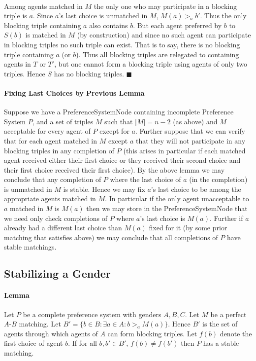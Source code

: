 \documentclass[letterpaper,12pt,oneside,onecolumn]{article}
\begin{document}
\paragraph{}
Among agents matched in $M$ the only one who may participate in a blocking triple is $a$. Since $a$'s last choice is unmatched in $M$, $M(a) >_a b'$. Thus the only blocking triple containing $a$ also contains $b$. But each agent preferred by $b$ to $S(b)$ is matched in $M$ (by construction) and since no such agent can participate in blocking triples no such triple can exist. That is to say, there is no blocking triple containing $a$ (or $b$). Thus all blocking triples are relegated to containing agents in $T$ or $T'$, but one cannot form a blocking triple using agents of only two triples. Hence $S$ has no blocking triples. $\blacksquare$
\paragraph{Fixing Last Choices by Previous Lemma}
Suppose we have a PreferenceSystemNode containing incomplete Preference System $P$, and a set of triples $M$ such that $|M| = n-2$ (as above) and $M$ acceptable for every agent of $P$ except for $a$. Further suppose that we can verify that for each agent matched in $M$ except $a$ that they will not participate in any blocking triples in any completion of $P$ (this arises in particular if each matched agent received either their first choice or they received their second choice and their first choice received their first choice). By the above lemma we may conclude that any completion of $P$ where the last choice of $a$ (in the completion) is unmatched in $M$ is stable. Hence we may fix $a$'s last choice to be among the appropriate agents matched in $M$. In particular if the only agent unacceptable to $a$ matched in $M$ is $M(a)$ then we may store in the PreferenceSystemNode that we need only check completions of $P$ where $a$'s last choice is $M(a)$. Further if $a$ already had a different last choice than $M(a)$ fixed for it (by some prior matching that satisfies above) we may conclude that all completions of $P$ have stable matchings.
\subsection{Stabilizing a Gender}
\paragraph{Lemma}
Let $P$ be a complete preference system with genders $A,B,C$. Let $M$ be a perfect $A$-$B$ matching. Let $B' = \{ b \in B : \exists a \in A : b >_a M(a) \}$. Hence $B'$ is the set of agents through which agents of $A$ can form blocking triples. Let $f(b)$ denote the first choice of agent $b$. If for all $b, b' \in B'$, $f(b) \neq f(b')$ then $P$ has a stable matching.
\end{document}
